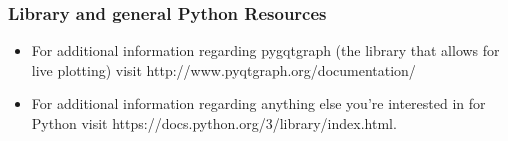 \subsubsection{Library and general Python Resources}
\begin{itemize}
	\item For additional information regarding pygqtgraph (the library that allows for live plotting) visit http://www.pyqtgraph.org/documentation/
	\item For additional information regarding anything else you're interested in for Python visit https://docs.python.org/3/library/index.html. 
\end{itemize}